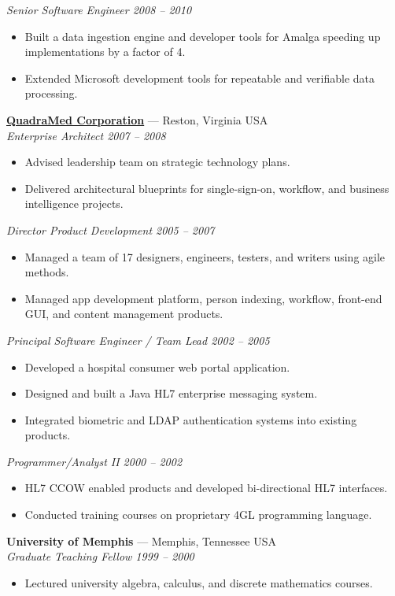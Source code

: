 \documentclass[10pt,letterpaper]{article}
\begin{document}
\textit{Senior Software Engineer \hfill 2008 -- 2010}
\begin{itemize}
\item Built a data ingestion engine and developer tools for Amalga speeding up implementations by a factor of 4.
\item Extended Microsoft development tools for repeatable and verifiable data processing.
\end{itemize}

\textbf{\href{http://www.quadramed.com/}{QuadraMed Corporation}} --- Reston, Virginia USA\\
\textit{Enterprise Architect \hfill 2007 -- 2008}
\begin{itemize}
\item Advised leadership team on strategic technology plans.
\item Delivered architectural blueprints for single-sign-on, workflow, and business intelligence projects.
\end{itemize}

\textit{Director Product Development \hfill 2005 -- 2007}
\begin{itemize}
\item Managed a team of 17 designers, engineers, testers, and writers using agile methods.
\item Managed app development platform, person indexing, workflow, front-end GUI, and content management products.
\end{itemize}

\textit{Principal Software Engineer / Team Lead \hfill 2002 -- 2005}
\begin{itemize}
\item Developed a hospital consumer web portal application.
\item Designed and built a Java HL7 enterprise messaging system.
\item Integrated biometric and LDAP authentication systems into existing products.
\end{itemize}

\textit{Programmer/Analyst II \hfill 2000 -- 2002}
\begin{itemize}
\item HL7 CCOW enabled products and developed bi-directional HL7 interfaces.
\item Conducted training courses on proprietary 4GL programming language.
\end{itemize}

\textbf{University of Memphis} --- Memphis, Tennessee USA\\
\textit{Graduate Teaching Fellow \hfill 1999 -- 2000}
\begin{itemize}
\item Lectured university algebra, calculus, and discrete mathematics courses.
\end{itemize}
\end{document}
